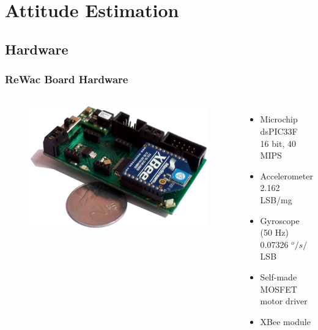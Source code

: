 \section{Attitude Estimation}

\subsection*{Hardware}
\begin{frame}
\frametitle{ReWac Board Hardware}
    \begin{columns}
        \begin{figure}
        \centering
        \includegraphics[scale=0.2]{fig/rewac.png}
        \end{figure}
        
        \begin{itemize}
        \item
        Microchip dsPIC33F\\[0.05in]
        16 bit, 40 MIPS\\[0.1in]
        \item
        Accelerometer\\[0.05in]
        2.162 LSB/mg\\[0.1in]
        \item
        Gyroscope (50 Hz)\\[0.05in]
        0.07326 $^o/s/$LSB\\[0.1in]
        \item
        Self-made MOSFET motor driver\\[0.1in]
        \item
        XBee module\\[0.1in]
        \end{itemize}
    \end{columns}
\end{frame}


